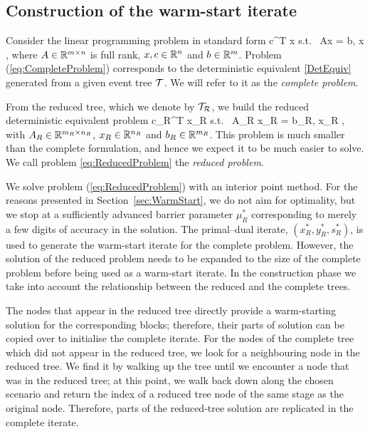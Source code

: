 %
%
\subsection{Construction of the warm-start iterate}
\label{sec:Construction}

Consider the linear programming problem in standard form
\be  \label{eq:CompleteProblem}
\min\;  c^T x \;\quad \mbox{s.t. }\; Ax = b, \;\; x ,
\ee
where $A \in \mathbb{R}^{m \times n}$ is full rank, 
$x, c \in \mathbb{R}^{n}$ and $b \in \mathbb{R}^{m}$. 
Problem (\ref{eq:CompleteProblem})
corresponds to the deterministic equivalent \eqref{DetEquiv} generated from a
given event tree $\mathcal{T}$. We will refer to it as the 
{\em complete problem}.

From the reduced tree, which we denote by $\mathcal{T}_\mathcal{R}$, 
we build the reduced deterministic 
equivalent problem
\be \label{eq:ReducedProblem}
\min\; c_R^T x_R \;\quad \mbox{s.t. }\; A_R x_R = b_R, \; x_R ,
\ee
with $A_R \in \mathbb{R}^{m_R\times n_R}$, $x_R \in 
\mathbb{R}^{n_R}$ and $b_R \in \mathbb{R}^{m_R}$. This problem is 
much smaller than the complete formulation, and hence we expect it to 
be much easier to solve.
We call problem \eqref{eq:ReducedProblem} the {\em reduced problem}.

We solve problem (\ref{eq:ReducedProblem}) with an interior point method. 
For the reasons presented in Section~\ref{sec:WarmStart}, we do not 
aim for optimality, but we stop at a sufficiently advanced barrier 
parameter $\mu^*_R$ corresponding to merely a few digits of accuracy in the 
solution. The primal--dual iterate, $(x_R^*,y_R^*,s_R^*)$, 
is used to generate the warm-start iterate for the complete problem.
However, the solution of the reduced problem needs to be expanded to the size 
of the complete problem before being used as a warm-start iterate.
In the construction phase we take into account the relationship
between the reduced and the complete trees.

The nodes that appear in the reduced tree directly provide a warm-starting
solution for the corresponding blocks; therefore, their parts of solution
can be copied over to initialise the complete iterate.
%
For the nodes of the complete tree which did not appear in the reduced 
tree, we look for a neighbouring node in the reduced tree. We find it 
by walking up the tree until we encounter a node that was in the reduced 
tree; at this point, we walk back down along the chosen scenario and return 
the index of a reduced tree node of the same stage as the original 
node.
Therefore, parts of the reduced-tree solution are replicated in the 
complete iterate. 

